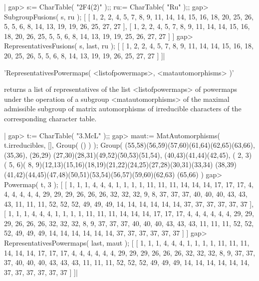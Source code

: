 |    gap> s:= CharTable( "2F4(2)" );; ru:= CharTable( "Ru" );;
    gap> SubgroupFusions( s, ru );
    [ [ 1, 2, 2, 4, 5, 7, 8, 9, 11, 14, 14, 15, 16, 18, 20, 25, 26, 5, 5,
          6, 8, 14, 13, 19, 19, 26, 25, 27, 27 ], 
      [ 1, 2, 2, 4, 5, 7, 8, 9, 11, 14, 14, 15, 16, 18, 20, 26, 25, 5, 5,
          6, 8, 14, 13, 19, 19, 25, 26, 27, 27 ] ]
    gap> RepresentativesFusions( s, last, ru );
    [ [ 1, 2, 2, 4, 5, 7, 8, 9, 11, 14, 14, 15, 16, 18, 20, 25, 26, 5, 5,
          6, 8, 14, 13, 19, 19, 26, 25, 27, 27 ] ]|

%

'RepresentativesPowermaps( <listofpowermaps>, <matautomorphisms> )'

returns a list of representatives of the list <listofpowermaps> of powermaps
under the operation of a subgroup <matautomorphisms> of the maximal
admissible subgroup of matrix automorphisms of irreducible characters of the
corresponding character table. 

|    gap> t:= CharTable( "3.McL" );;
    gap> maut:= MatAutomorphisms( t.irreducibles, [], Group( () ) );
    Group( (55,58)(56,59)(57,60)(61,64)(62,65)(63,66), (35,36), (26,29)
    (27,30)(28,31)(49,52)(50,53)(51,54), (40,43)(41,44)(42,45), ( 2, 3)
    ( 5, 6)( 8, 9)(12,13)(15,16)(18,19)(21,22)(24,25)(27,28)(30,31)(33,34)
    (38,39)(41,42)(44,45)(47,48)(50,51)(53,54)(56,57)(59,60)(62,63)
    (65,66) )
    gap> Powermap( t, 3 );
    [ [ 1, 1, 1, 4, 4, 4, 1, 1, 1, 1, 11, 11, 11, 14, 14, 14, 17, 17, 17,
          4, 4, 4, 4, 4, 4, 29, 29, 29, 26, 26, 26, 32, 32, 32, 9, 8, 37,
          37, 37, 40, 40, 40, 43, 43, 43, 11, 11, 11, 52, 52, 52, 49, 49,
          49, 14, 14, 14, 14, 14, 14, 37, 37, 37, 37, 37, 37 ], 
      [ 1, 1, 1, 4, 4, 4, 1, 1, 1, 1, 11, 11, 11, 14, 14, 14, 17, 17, 17,
          4, 4, 4, 4, 4, 4, 29, 29, 29, 26, 26, 26, 32, 32, 32, 8, 9, 37,
          37, 37, 40, 40, 40, 43, 43, 43, 11, 11, 11, 52, 52, 52, 49, 49,
          49, 14, 14, 14, 14, 14, 14, 37, 37, 37, 37, 37, 37 ] ]
    gap> RepresentativesPowermaps( last, maut );
    [ [ 1, 1, 1, 4, 4, 4, 1, 1, 1, 1, 11, 11, 11, 14, 14, 14, 17, 17, 17,
          4, 4, 4, 4, 4, 4, 29, 29, 29, 26, 26, 26, 32, 32, 32, 8, 9, 37,
          37, 37, 40, 40, 40, 43, 43, 43, 11, 11, 11, 52, 52, 52, 49, 49,
          49, 14, 14, 14, 14, 14, 14, 37, 37, 37, 37, 37, 37 ] ]|


